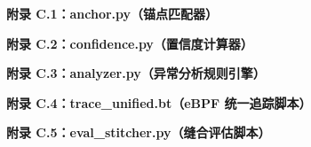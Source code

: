\documentclass[12pt,a4paper]{ctexbook}
\begin{document}
\begin{center}
\textbf{附录 C.1：anchor.py（锚点匹配器）}
\end{center}

\newpage

\begin{center}
\textbf{附录 C.2：confidence.py（置信度计算器）}
\end{center}

\newpage

\begin{center}
\textbf{附录 C.3：analyzer.py（异常分析规则引擎）}
\end{center}

\newpage

\begin{center}
\textbf{附录 C.4：trace\_unified.bt（eBPF 统一追踪脚本）}
\end{center}

\newpage

\begin{center}
\textbf{附录 C.5：eval\_stitcher.py（缝合评估脚本）}
\end{center}

\newpage
\end{document}
